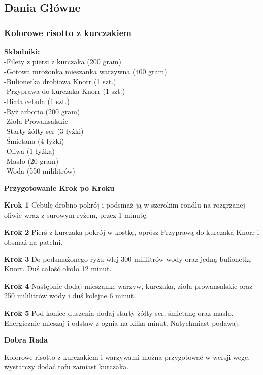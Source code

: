 \documentclass[12pt, letterpaper, titlepage]{article}
\begin{document}
\subsection{Dania Główne}
\subsubsection{Kolorowe risotto z kurczakiem}
\begin{flushleft}
\textbf{Składniki:}\\-Filety z piersi z kurczaka (200 gram)\\-Gotowa mrożonka mieszanka warzywna (400 gram)\\-Bulionetka drobiowa Knorr (1 szt.)\\-Przyprawa do kurczaka Knorr (1 szt.)\\-Biała cebula (1 szt.)\\-Ryż arborio (200 gram)\\-Zioła Prowansalskie\\-Starty żółty ser (3 łyżki)\\-Śmietana (4 łyżki)\\-Oliwa (1 łyżka)\\-Masło (20 gram)\\-Woda (550 mililitrów)\\
\end{flushleft}
\begin{center}
\textbf{Przygotowanie Krok po Kroku}
\end{center}

\begin{flushleft}
\textbf{Krok 1}
	Cebulę drobno pokrój i podsmaż ją w szerokim rondlu na rozgrzanej oliwie wraz z surowym ryżem, przez 1 minutę.
\end{flushleft}
\begin{flushleft}
\textbf{Krok 2}
	Pierś z kurczaka pokrój w kostkę, oprósz Przyprawą do kurczaka Knorr i obsmaż na patelni.
\end{flushleft}
\begin{flushleft}
\textbf{Krok 3}
	Do podsmażonego ryżu wlej 300 mililitrów wody oraz jedną bulionetkę Knorr. Duś całość około 12 minut.
\end{flushleft}
\begin{flushleft}
\textbf{Krok 4}
	Następnie dodaj mieszankę warzyw, kurczaka, zioła prowansalskie oraz 250 mililitrów wody i duś kolejne 6 minut.
\end{flushleft}
\begin{flushleft}
\textbf{Krok 5}
	Pod koniec duszenia dodaj starty żółty ser, śmietanę oraz masło. Energicznie mieszaj i odstaw z ognia na kilka minut. Natychmiast podawaj.

\end{flushleft}
\begin{center}
\textbf{Dobra Rada}
\end{center}
	Kolorowe risotto z kurczakiem i warzywami można przygotować w wersji wege, wystarczy dodać tofu zamiast kurczaka.
\newpage
\end{document}
